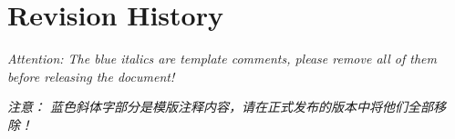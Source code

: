 
\clearpage



{\centering\section*{Revision History}}




{\textit{Attention: The blue italics are template comments, please remove all of them before releasing the document!}}

{\textit{注意： 蓝色斜体字部分是模版注释内容，请在正式发布的版本中将他们全部移除！}}
